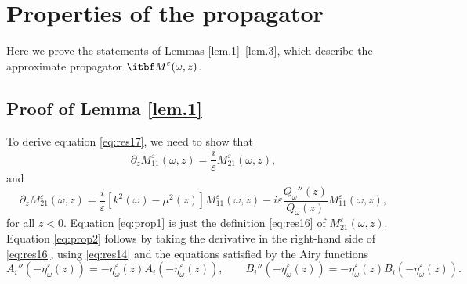 \documentclass[final]{siamltex}
\begin{document}
\section{Properties of the propagator}
\label{ap:propagator} 
Here we prove the statements of Lemmas \ref{lem.1}--\ref{lem.3}, which
describe the approximate propagator ${{\itbf M}}^{\varepsilon}({\omega},z)$.
\subsection{Proof of Lemma \ref{lem.1}} To derive equation
\eqref{eq:res17}, we need to show that
\begin{equation}
\partial_z M_{11}^{\varepsilon}({\omega},z) = \frac{i}{\varepsilon} M_{21}^{\varepsilon}({\omega},z), \label{eq:prop1}
\end{equation}
and 
\begin{equation}
\partial_z M_{21}^{\varepsilon}({\omega},z) = \frac{i}{\varepsilon} [k^2({\omega})-\mu^2(z)] M_{11}^{\varepsilon}({\omega},z) -
i {\varepsilon} \frac{Q_{\omega}''(z)}{Q_{\omega}(z)} M_{11}^{\varepsilon}({\omega},z),
\label{eq:prop2}
\end{equation}
for all $z < 0$. Equation \eqref{eq:prop1} is just the definition
\eqref{eq:res16} of $M_{21}^{\varepsilon}({\omega},z)$. Equation \eqref{eq:prop2}
follows by taking the derivative in the right-hand side of
\eqref{eq:res16}, using \eqref{eq:res14} and the equations satisfied
by the Airy functions \cite[chapter 10]{abramowitz1972handbook}
\begin{equation}
A_i''(-\eta_{\omega}^{\varepsilon}(z)) = - \eta_{\omega}^{\varepsilon}(z) A_i(-\eta_{\omega}^{\varepsilon}(z)), \qquad 
B_i''(-\eta_{\omega}^{\varepsilon}(z)) = - \eta_{\omega}^{\varepsilon}(z) B_i(-\eta_{\omega}^{\varepsilon}(z)).
\label{eq:prop3}
\end{equation}
\end{document}
